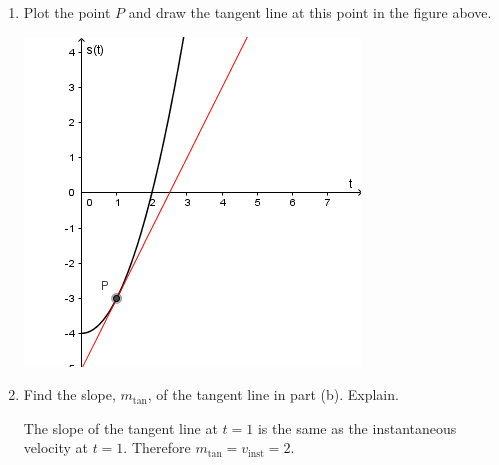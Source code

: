 \documentclass[nooutcomes, handout]{ximera}
\begin{document}
\begin{problem}
\begin{enumerate}
\begin{enumerate}
\item
Plot the point $P$ and draw the tangent line at this point in the figure above.
\begin{freeResponse} \hfil
\begin{image}
\includegraphics[scale = .7]{Figure11.png}
\end{image}
\end{freeResponse}


\item
Find the slope, $m_{\mathrm{tan}}$, of the tangent line in part (b).
Explain.
\begin{freeResponse}
The slope of the tangent line at $t = 1$ is the same as the instantaneous velocity at $t = 1$.
Therefore $m_{\mathrm{tan}} = v_{\mathrm{inst}} = 2$.
\end{freeResponse}
\end{enumerate}


\end{enumerate}
\end{problem} 
	
	
	
	
	
	
	

	










								
				
				
	
\end{document}
